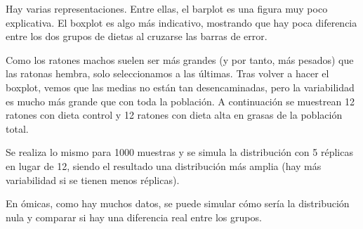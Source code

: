 Hay varias representaciones. Entre ellas, el barplot es una figura muy poco explicativa. El boxplot es algo más indicativo, mostrando que hay poca diferencia entre los dos grupos de dietas al cruzarse las barras de error.

Como los ratones machos suelen ser más grandes (y por tanto, más pesados) que las ratonas hembra, solo seleccionamos a las últimas. Tras volver a hacer el boxplot, vemos que las medias no están tan desencaminadas, pero la variabilidad es mucho más grande que con toda la población. A continuación se muestrean 12 ratones con dieta control y 12 ratones con dieta alta en grasas de la población total. 

Se realiza lo mismo para 1000 muestras y se simula la distribución con 5 réplicas en lugar de 12, siendo el resultado una distribución más amplia (hay más variabilidad si se tienen menos réplicas). 

En ómicas, como hay muchos datos, se puede simular cómo sería la distribución nula y comparar si hay una diferencia real entre los grupos.